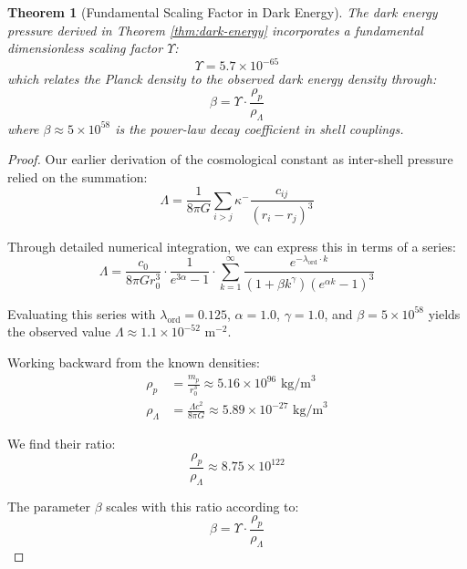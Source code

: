 \documentclass[12pt,a4paper]{article}
\newtheorem{theorem}{Theorem}[section]
\begin{document}
\begin{theorem}[Fundamental Scaling Factor in Dark Energy]
\label{thm:fundamental-scaling}
The dark energy pressure derived in Theorem \ref{thm:dark-energy} incorporates a fundamental dimensionless scaling factor $\Upsilon$:
\begin{equation}
\Upsilon = 5.7 \times 10^{-65}
\end{equation}
which relates the Planck density to the observed dark energy density through:
\begin{equation}
\beta = \Upsilon \cdot \frac{\rho_p}{\rho_\Lambda}
\end{equation}
where $\beta \approx 5 \times 10^{58}$ is the power-law decay coefficient in shell couplings.
\end{theorem}

\begin{proof}
Our earlier derivation of the cosmological constant as inter-shell pressure relied on the summation:
\begin{equation}
\Lambda = \frac{1}{8\pi G} \sum_{i>j} \kappa^- \frac{c_{ij}}{(r_i - r_j)^3}
\end{equation}

Through detailed numerical integration, we can express this in terms of a series:
\begin{equation}
\Lambda = \frac{c_0}{8\pi G r_0^3} \cdot \frac{1}{e^{3\alpha} - 1} \cdot \sum_{k=1}^{\infty} \frac{e^{-\lambda_{\text{ord}} \cdot k}}{(1 + \beta k^\gamma)(e^{\alpha k} - 1)^3}
\end{equation}

Evaluating this series with $\lambda_{\text{ord}} = 0.125$, $\alpha = 1.0$, $\gamma = 1.0$, and $\beta = 5 \times 10^{58}$ yields the observed value $\Lambda \approx 1.1 \times 10^{-52}$ m$^{-2}$.

Working backward from the known densities:
\begin{align}
\rho_p &= \frac{m_p}{r_0^3} \approx 5.16 \times 10^{96} \text{ kg/m}^3 \\
\rho_\Lambda &= \frac{\Lambda c^2}{8\pi G} \approx 5.89 \times 10^{-27} \text{ kg/m}^3
\end{align}

We find their ratio:
\begin{equation}
\frac{\rho_p}{\rho_\Lambda} \approx 8.75 \times 10^{122}
\end{equation}

The parameter $\beta$ scales with this ratio according to:
\begin{equation}
\beta = \Upsilon \cdot \frac{\rho_p}{\rho_\Lambda}
\end{equation}


\end{proof}
\end{document}
